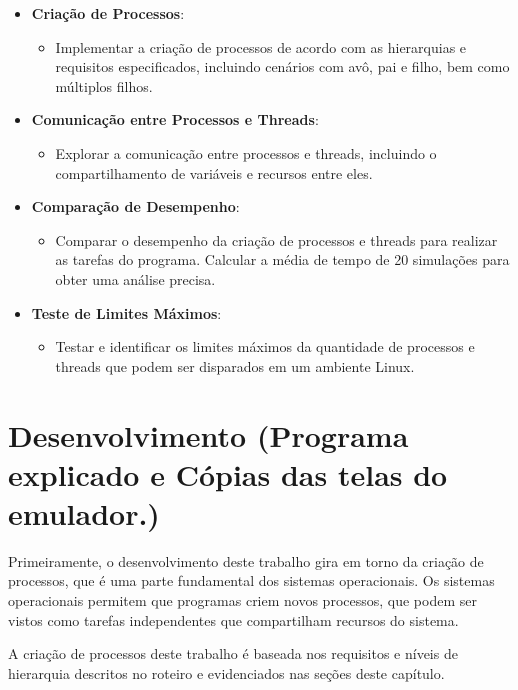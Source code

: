 \documentclass[
	12pt,				%
	openright,			%
	oneside,			%
	a4paper,			%
	chapter=TITLE,		%
	english,			%
	french,				%
	spanish,			%
	brazil				%
	]{abntex2}
\theoremstyle{definition}
\begin{document}
\begin{itemize}
    \item \textbf{Criação de Processos}:
    \begin{itemize}
        \item Implementar a criação de processos de acordo com as hierarquias e requisitos especificados, incluindo cenários com avô, pai e filho, bem como múltiplos filhos.
    \end{itemize}

    \item \textbf{Comunicação entre Processos e Threads}:
    \begin{itemize}
        \item Explorar a comunicação entre processos e threads, incluindo o compartilhamento de variáveis e recursos entre eles.
    \end{itemize}

    \item \textbf{Comparação de Desempenho}:
    \begin{itemize}
        \item Comparar o desempenho da criação de processos e threads para realizar as tarefas do programa. Calcular a média de tempo de 20 simulações para obter uma análise precisa.
    \end{itemize}

    \item \textbf{Teste de Limites Máximos}:
    \begin{itemize}
        \item Testar e identificar os limites máximos da quantidade de processos e threads que podem ser disparados em um ambiente Linux. 
    \end{itemize}
\end{itemize}
  
\chapter{Desenvolvimento (Programa explicado e Cópias das telas do emulador.)}

Primeiramente, o desenvolvimento deste trabalho gira em torno da criação
de processos, que é uma parte fundamental dos sistemas operacionais. 
Os sistemas operacionais permitem que programas criem novos processos, que 
podem ser vistos como tarefas independentes que compartilham recursos do sistema. 

A criação de processos deste trabalho é baseada nos requisitos e níveis de hierarquia descritos 
no roteiro e evidenciados nas seções deste capítulo.
\end{document}
